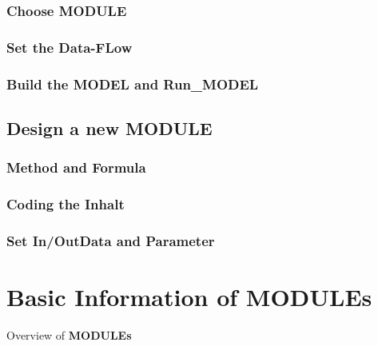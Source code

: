 \documentclass[
]{book}
\begin{document}
\hypertarget{choose-module}{%
\subsection{Choose MODULE}\label{choose-module}}

\hypertarget{set-the-data-flow}{%
\subsection{Set the Data-FLow}\label{set-the-data-flow}}

\hypertarget{build-the-model-and-run_model}{%
\subsection{Build the MODEL and Run\_MODEL}\label{build-the-model-and-run_model}}

\hypertarget{design-a-new-module}{%
\section{Design a new MODULE}\label{design-a-new-module}}

\hypertarget{method-and-formula}{%
\subsection{Method and Formula}\label{method-and-formula}}

\hypertarget{coding-the-inhalt}{%
\subsection{Coding the Inhalt}\label{coding-the-inhalt}}

\hypertarget{set-inoutdata-and-parameter}{%
\subsection{Set In/OutData and Parameter}\label{set-inoutdata-and-parameter}}

\hypertarget{module}{%
\chapter{Basic Information of MODULEs}\label{module}}

Overview of \textbf{MODULEs}
\end{document}
